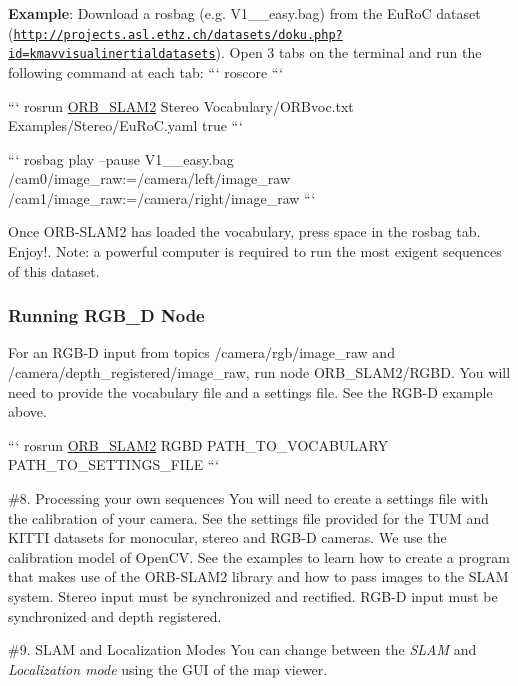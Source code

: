 {\bfseries Example}\-: Download a rosbag (e.\-g. V1\-\_\-\_\-easy.\-bag) from the Eu\-Ro\-C dataset (\href{http://projects.asl.ethz.ch/datasets/doku.php?id=kmavvisualinertialdatasets}{\tt http\-://projects.\-asl.\-ethz.\-ch/datasets/doku.\-php?id=kmavvisualinertialdatasets}). Open 3 tabs on the terminal and run the following command at each tab\-: ``` roscore ```

``` rosrun \hyperlink{namespaceORB__SLAM2}{O\-R\-B\-\_\-\-S\-L\-A\-M2} Stereo Vocabulary/\-O\-R\-Bvoc.\-txt Examples/\-Stereo/\-Eu\-Ro\-C.\-yaml true ```

``` rosbag play --pause V1\-\_\-\_\-easy.\-bag /cam0/image\-\_\-raw\-:=/camera/left/image\-\_\-raw /cam1/image\-\_\-raw\-:=/camera/right/image\-\_\-raw ```

Once O\-R\-B-\/\-S\-L\-A\-M2 has loaded the vocabulary, press space in the rosbag tab. Enjoy!. Note\-: a powerful computer is required to run the most exigent sequences of this dataset.

\subsubsection*{Running R\-G\-B\-\_\-\-D Node}

For an R\-G\-B-\/\-D input from topics {\ttfamily /camera/rgb/image\-\_\-raw} and {\ttfamily /camera/depth\-\_\-registered/image\-\_\-raw}, run node O\-R\-B\-\_\-\-S\-L\-A\-M2/\-R\-G\-B\-D. You will need to provide the vocabulary file and a settings file. See the R\-G\-B-\/\-D example above.

``` rosrun \hyperlink{namespaceORB__SLAM2}{O\-R\-B\-\_\-\-S\-L\-A\-M2} R\-G\-B\-D P\-A\-T\-H\-\_\-\-T\-O\-\_\-\-V\-O\-C\-A\-B\-U\-L\-A\-R\-Y P\-A\-T\-H\-\_\-\-T\-O\-\_\-\-S\-E\-T\-T\-I\-N\-G\-S\-\_\-\-F\-I\-L\-E ```

\#8. Processing your own sequences You will need to create a settings file with the calibration of your camera. See the settings file provided for the T\-U\-M and K\-I\-T\-T\-I datasets for monocular, stereo and R\-G\-B-\/\-D cameras. We use the calibration model of Open\-C\-V. See the examples to learn how to create a program that makes use of the O\-R\-B-\/\-S\-L\-A\-M2 library and how to pass images to the S\-L\-A\-M system. Stereo input must be synchronized and rectified. R\-G\-B-\/\-D input must be synchronized and depth registered.

\#9. S\-L\-A\-M and Localization Modes You can change between the {\itshape S\-L\-A\-M} and {\itshape Localization mode} using the G\-U\-I of the map viewer.

